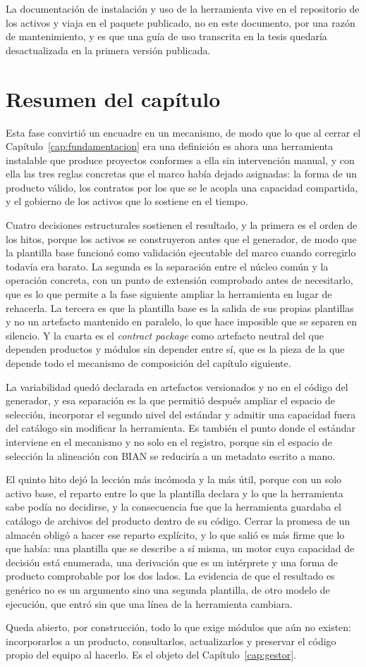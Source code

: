 La documentación de instalación y uso de la herramienta vive en el
repositorio de los activos y viaja en el paquete publicado, no en este
documento, por una razón de mantenimiento, y es que una guía de uso transcrita
en la tesis quedaría desactualizada en la primera versión publicada.

\section{Resumen del capítulo}

Esta fase convirtió un encuadre en un mecanismo, de modo que lo que al cerrar el
Capítulo~\ref{cap:fundamentacion} era una definición es ahora una herramienta
instalable que produce proyectos conformes a ella sin intervención manual, y
con ella las tres reglas concretas que el marco había dejado asignadas: la
forma de un producto válido, los contratos por los que se le acopla una
capacidad compartida, y el gobierno de los activos que lo sostiene en el
tiempo.

Cuatro decisiones estructurales sostienen el resultado, y la primera es el
orden de los hitos, porque los activos se construyeron antes que el
generador, de modo que la plantilla base funcionó como validación ejecutable
del marco cuando corregirlo todavía era barato. La segunda es la separación
entre el núcleo común y la operación concreta, con un punto de extensión
comprobado antes de necesitarlo, que es lo que permite a la fase siguiente
ampliar la herramienta en lugar de rehacerla. La tercera es que la plantilla
base es la salida de sus propias plantillas y no un artefacto mantenido en
paralelo, lo que hace imposible que se separen en silencio. Y la cuarta es el
\emph{contract package} como artefacto neutral del que dependen productos y
módulos sin depender entre sí, que es la pieza de la que depende todo el
mecanismo de composición del capítulo siguiente.

La variabilidad quedó declarada en artefactos versionados y no en el código
del generador, y esa separación es la que permitió después ampliar el espacio
de selección, incorporar el segundo nivel del estándar y admitir una
capacidad fuera del catálogo sin modificar la herramienta. Es también el
punto donde el estándar interviene en el mecanismo y no solo en el registro,
porque sin el espacio de selección la alineación con BIAN se reduciría a un
metadato escrito a mano.

El quinto hito dejó la lección más incómoda y la más útil, porque con un solo
activo base, el reparto entre lo que la plantilla declara y lo que la
herramienta sabe podía no decidirse, y la consecuencia fue que la herramienta
guardaba el catálogo de archivos del producto dentro de su código. Cerrar la
promesa de un almacén obligó a hacer ese reparto explícito, y lo que salió es
más firme que lo que había: una plantilla que se describe a sí misma, un motor
cuya capacidad de decisión está enumerada, una derivación que es un intérprete
y una forma de producto comprobable por los dos lados. La evidencia de que el
resultado es genérico no es un argumento sino una segunda plantilla, de otro
modelo de ejecución, que entró sin que una línea de la herramienta cambiara.

Queda abierto, por construcción, todo lo que exige módulos que aún no
existen: incorporarlos a un producto, consultarlos, actualizarlos y preservar
el código propio del equipo al hacerlo. Es el objeto del
Capítulo~\ref{cap:gestor}.

